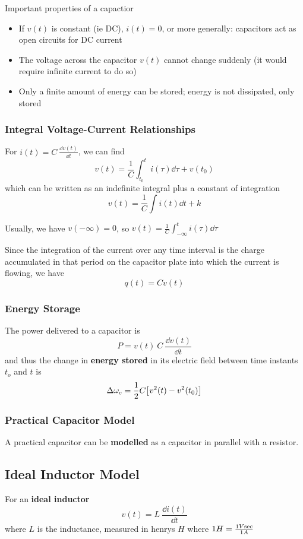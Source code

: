 \documentclass[12pt]{article}
\begin{document}
Important properties of a capactior
\begin{itemize}
\item If $v(t)$ is constant (ie DC), $i(t) = 0$, or more generally: capacitors act as open circuits for DC current
\item The voltage across the capacitor $v(t)$ cannot change suddenly (it would require infinite current to do so)
\item Only a finite amount of energy can be stored; energy is not dissipated, only stored
\end{itemize}

\subsubsection*{Integral Voltage-Current Relationships}
For $i(t) = C\ \frac{\dd v(t)}{\dd t}$, we can find \[ v(t) = \frac{1}{C} \int_{t_0}^t i(\tau) \dd\tau + v(t_0) \] which can be written as an indefinite integral plus a constant of integration \[ v(t) = \frac{1}{C} \int i(t) \dd t + k \]

Usually, we have $v(-\infty) = 0$, so $v(t) = \frac{1}{C} \int_{-\infty}^t i(\tau) \dd\tau$

Since the integration of the current over any time interval is the charge accumulated in that period on the capacitor plate into which the current is flowing, we have \[ q(t) = Cv(t) \]

\subsubsection*{Energy Storage}
The power delivered to a capacitor is \[ P = v(t)\ C\ \frac{\dd v(t)}{\dd t} \] and thus the change in {\bf energy stored} in its electric field between time instants $t_o$ and $t$ is \[ \Delta\omega_c = \frac{1}{2} C\bigl[v^2(t) - v^2(t_0)\bigl] \]

\subsubsection*{Practical Capacitor Model}
A practical capacitor can be {\bf modelled} as a capacitor in parallel with a resistor.

\subsection*{Ideal Inductor Model}
For an {\bf ideal inductor} \[ v(t) = L\ \frac{\dd i(t)}{\dd t} \] where $L$ is the inductance, measured in henrys $H$ where $1H = \frac{1V{\rm sec}}{1A}$
\end{document}
